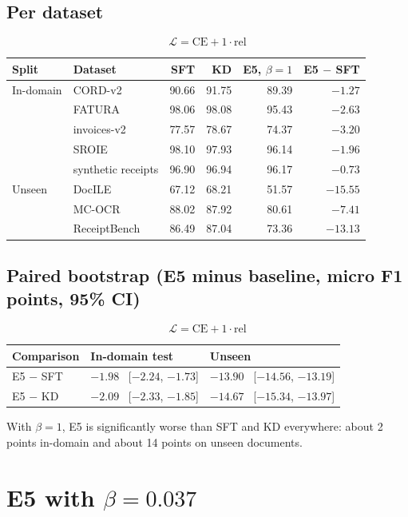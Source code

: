 \documentclass[10pt]{article}
\newcommand{\lossone}{\[ \mathcal{L} = \mathrm{CE} + 1 \cdot \mathrm{rel} \]}
\begin{document}
\subsection*{Per dataset}
\lossone
\begin{center}
\begin{tabular}{llrrrr}
\toprule
Split & Dataset & SFT & KD & E5, $\beta = 1$ & E5 $-$ SFT \\
\midrule
In-domain & CORD-v2 & 90.66 & 91.75 & 89.39 & $-1.27$ \\
 & FATURA & 98.06 & 98.08 & 95.43 & $-2.63$ \\
 & invoices-v2 & 77.57 & 78.67 & 74.37 & $-3.20$ \\
 & SROIE & 98.10 & 97.93 & 96.14 & $-1.96$ \\
 & synthetic receipts & 96.90 & 96.94 & 96.17 & $-0.73$ \\
\midrule
Unseen & DocILE & 67.12 & 68.21 & 51.57 & $-15.55$ \\
 & MC-OCR & 88.02 & 87.92 & 80.61 & $-7.41$ \\
 & ReceiptBench & 86.49 & 87.04 & 73.36 & $-13.13$ \\
\bottomrule
\end{tabular}
\end{center}

\subsection*{Paired bootstrap (E5 minus baseline, micro F1 points, 95\% CI)}
\lossone
\begin{center}
\begin{tabular}{lll}
\toprule
Comparison & In-domain test & Unseen \\
\midrule
E5 $-$ SFT & $-1.98$ \ [$-2.24$, $-1.73$] & $-13.90$ \ [$-14.56$, $-13.19$] \\
E5 $-$ KD & $-2.09$ \ [$-2.33$, $-1.85$] & $-14.67$ \ [$-15.34$, $-13.97$] \\
\bottomrule
\end{tabular}
\end{center}

With $\beta = 1$, E5 is significantly worse than SFT and KD everywhere: about 2 points in-domain and about 14 points on unseen documents.

\section{E5 with $\beta = 0.037$}
\end{document}
